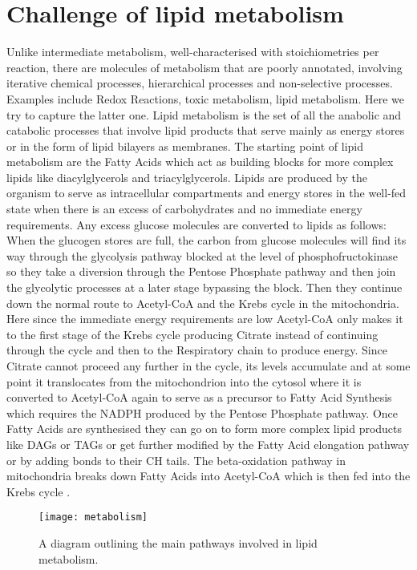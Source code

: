 \section{Challenge of lipid metabolism}
Unlike intermediate metabolism, well-characterised with
stoichiometries per reaction, there are molecules of metabolism that
are poorly annotated, involving iterative chemical processes,
hierarchical processes and non-selective processes. Examples include
Redox Reactions, toxic metabolism, lipid metabolism. Here we try to
capture the latter one.
Lipid metabolism is the set of all the anabolic and catabolic
processes that involve lipid products that serve mainly as energy
stores or in the form of lipid bilayers as membranes. The starting
point of lipid metabolism are the Fatty Acids which act as building
blocks for more complex lipids like diacylglycerols and triacylglycerols. Lipids are
produced by the organism to serve as intracellular compartments and energy stores in the well-fed state when there is an excess
of carbohydrates and no immediate energy requirements. Any excess
glucose molecules are converted to lipids as follows: When the
glucogen stores are full, the carbon from glucose molecules will find its way through
the glycolysis pathway blocked at the level of phosphofructokinase so
they take a diversion through the Pentose Phosphate pathway and then
join the glycolytic processes at a later stage bypassing the
block. Then they continue down the normal route to Acetyl-CoA and the
Krebs cycle in the mitochondria. Here since the immediate energy requirements
are low Acetyl-CoA only makes it to the first stage of the Krebs cycle
producing Citrate instead of continuing through the cycle and then to
the Respiratory chain to produce energy. Since Citrate cannot proceed any further in the
cycle, its levels accumulate and at some point it translocates from
the mitochondrion into the cytosol where it is converted to Acetyl-CoA
again to serve as a precursor to Fatty Acid Synthesis which requires
the NADPH produced by the Pentose Phosphate pathway. Once Fatty Acids
are synthesised they can go on to form more complex lipid products
like DAGs or
TAGs or get further modified by the Fatty Acid elongation pathway or
by adding bonds to their CH tails. The beta-oxidation pathway in
mitochondria breaks down Fatty Acids into Acetyl-CoA which is then fed
into the Krebs cycle \cite [] {salway2013metabolism}.

\begin{figure}[htbp!]
\centering
\texttt{[image: metabolism]}
\caption[Lipid metabolism and interacting pathways]{A diagram
  outlining the main pathways involved in lipid metabolism.}
\label{fig:lipid_metabolism}
\end{figure}

